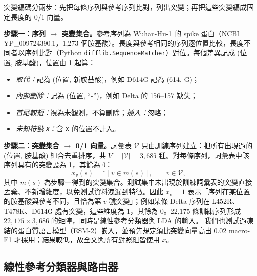 \documentclass[10pt,a4paper]{article}
\begin{document}
突變編碼分兩步：先把每條序列與參考序列比對，列出突變；再把這些突變編成固定長度的 0/1 向量。

\textbf{步驟一：序列 $\to$ 突變集合。}參考序列為 Wuhan-Hu-1 的 spike 蛋白（NCBI YP\_009724390.1，1,273 個胺基酸）。長度與參考相同的序列逐位置比較，長度不同者以序列比對（Python \texttt{difflib.SequenceMatcher}）對位。每個差異記成 (位置, 胺基酸)，位置由 1 起算：
\begin{itemize}[nosep]
    \item \emph{取代：}記為 (位置, 新胺基酸)，例如 D614G 記為 (614, G)；
    \item \emph{內部刪除：}記為 (位置, ``-'')，例如 Delta 的 156--157 缺失；
    \item \emph{首尾較短：}視為未觀測，不算刪除；\emph{插入：}忽略；
    \item \emph{未知符號 \texttt{X}：}含 \texttt{X} 的位置不計入。
\end{itemize}

\textbf{步驟二：突變集合 $\to$ 0/1 向量。}詞彙表 $\mathcal{V}$ 只由訓練序列建立：把所有出現過的 (位置, 胺基酸) 組合去重排序，共 $V=|\mathcal{V}|=3{,}686$ 種。對每條序列，詞彙表中該序列具有的突變設為 1，其餘為 0：
\begin{equation}
    x_v(s)=\mathbb{1}[v\in m(s)],\qquad v\in\mathcal{V},
    \label{eq:mutation}
\end{equation}
其中 $m(s)$ 為步驟一得到的突變集合。測試集中未出現於訓練詞彙表的突變直接丟棄、不新增維度，以免測試資料洩漏到特徵。因此 $x_v=1$ 表示「序列在某位置的胺基酸與參考不同，且恰為第 $v$ 號突變」；例如某條 Delta 序列在 L452R、T478K、D614G 處有突變，這些維度為 1，其餘為 0。22,175 條訓練序列形成 $22{,}175\times3{,}686$ 的矩陣，同時是線性參考分類器與 LDA 的輸入。
我們也測試過凍結的蛋白質語言模型（ESM-2）嵌入，並預先規定須比突變向量高出 0.02 macro-F1 才採用；結果較低，故全文與所有對照組皆使用 $x$。

\subsection{線性參考分類器與路由器}
\label{sec:router}
\end{document}
